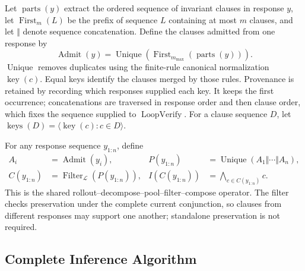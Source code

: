 Let \(\operatorname{parts}(y)\) extract the ordered sequence of invariant
clauses in response \(y\), let \(\operatorname{First}_{m}(L)\) be the prefix
of sequence \(L\) containing at most \(m\) clauses, and let \(\Vert\) denote
sequence concatenation.  Define the clauses admitted from one response by
\begin{equation}
  \operatorname{Admit}(y)=
  \operatorname{Unique}\!\left(
    \operatorname{First}_{m_{\max}}(\operatorname{parts}(y))
  \right).
  \label{eq:formal-admit}
\end{equation}
\(\operatorname{Unique}\) removes duplicates using the finite-rule
canonical normalization \(\operatorname{key}(c)\).  Equal keys identify the
clauses merged by those rules.  Provenance is retained by
recording which responses supplied each key.  It keeps the first occurrence;
concatenations are traversed in response order and then clause order, which
fixes the sequence supplied to \(\operatorname{LoopVerify}\).
For a clause sequence \(D\), let
\(\operatorname{keys}(D)=\langle\operatorname{key}(c):c\in D\rangle\).

For any response sequence \(y_{1:n}\), define
\begin{align}
  A_i&=\operatorname{Admit}(y_i),
  &P(y_{1:n})&=\operatorname{Unique}\!\left(A_1\Vert\cdots\Vert A_n\right),
  \label{eq:formal-pool}\\
  C(y_{1:n})&=\operatorname{Filter}_{\mathcal L}(P(y_{1:n})),
  &I(C(y_{1:n}))&=\bigwedge_{c\in C(y_{1:n})}c.
  \label{eq:formal-craft-map}
\end{align}
This is the shared rollout--decompose--pool--filter--compose operator.  The
filter checks preservation under the complete current conjunction, so clauses
from different responses may support one another; standalone preservation is
not required.

\subsection{Complete Inference Algorithm}

